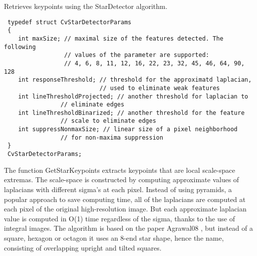 Retrieves keypoints using the StarDetector algorithm.


\begin{description}
\ifC
{}
\begin{lstlisting}
 typedef struct CvStarDetectorParams
 {
    int maxSize; // maximal size of the features detected. The following 
                 // values of the parameter are supported:
                 // 4, 6, 8, 11, 12, 16, 22, 23, 32, 45, 46, 64, 90, 128
    int responseThreshold; // threshold for the approximatd laplacian,
                           // used to eliminate weak features
    int lineThresholdProjected; // another threshold for laplacian to 
                // eliminate edges
    int lineThresholdBinarized; // another threshold for the feature 
                // scale to eliminate edges
    int suppressNonmaxSize; // linear size of a pixel neighborhood 
                // for non-maxima suppression
 }
 CvStarDetectorParams;
\end{lstlisting}
\else
{}
\fi
\end{description}

The function GetStarKeypoints extracts keypoints that are local
scale-space extremas. The scale-space is constructed by computing
approximate values of laplacians with different sigma's at each
pixel. Instead of using pyramids, a popular approach to save computing
time, all of the laplacians are computed at each pixel of the original
high-resolution image. But each approximate laplacian value is computed
in O(1) time regardless of the sigma, thanks to the use of integral
images. The algorithm is based on the paper 
Agrawal08
, but instead
of a square, hexagon or octagon it uses an 8-end star shape, hence the name,
consisting of overlapping upright and tilted squares.

